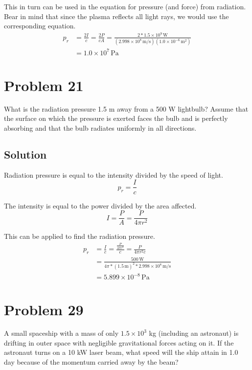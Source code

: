 \documentclass[12pt]{article}
\newcommand{\E}[1]{\times 10^{#1}}
\begin{document}
            This in turn can be used in the equation for pressure (and force) from radiation.
            Bear in mind that since the plasma reflects all light rays, we would use the corresponding equation.
            \begin{align}
                p_r &=  \frac{2I}{c}
                    =   \frac{2P}{cA}
                    =   \frac{2 * 1.5\E{9}\,\unit{\watt}}{(2.998\E{8}\,\unit{\meter/\second})(1.0\E{-6}\,\unit{\meter^2})}\\
                    &=  \boxed{1.0\E{7}\,\unit{\pascal}}
            \end{align}

    \pagebreak
    \section{Problem 21}
        What is the radiation pressure 1.5 m away from a 500 W lightbulb? 
        Assume that the surface on which the pressure is exerted faces the bulb and is perfectly absorbing and that the bulb radiates uniformly in all directions.

        \subsection{Solution}
            Radiation pressure is equal to the intensity divided by the speed of light.
            \begin{equation}
                p_r = \frac{I}{c}
            \end{equation}

            The intensity is equal to the power divided by the area affected.
            \begin{equation}
                I = \frac{P}{A} = \frac{P}{4\pi r^2}
            \end{equation}

            This can be applied to find the radiation pressure.
            \begin{align}
                p_r &=  \frac{I}{c}
                    =   \frac{\frac{P}{4\pi r^2}}{c}
                    =   \frac{P}{4\pi r^2 c}\\
                    &=  \frac{500\,\unit{\watt}}{4\pi * (1.5\,\unit{\meter})^2 * 2.998\E{8}\,\unit{\meter/\second}}\\
                    &=  \boxed{5.899\E{-8}\,\unit{\pascal}}
            \end{align}

    \pagebreak
    \section{Problem 29}
        A small spaceship with a mass of only $1.5\E{3}$ kg (including an astronaut) is drifting in outer space with negligible gravitational forces acting on it. 
        If the astronaut turns on a 10 kW laser beam, what speed will the ship attain in 1.0 day because of the momentum carried away by the beam?
\end{document}
